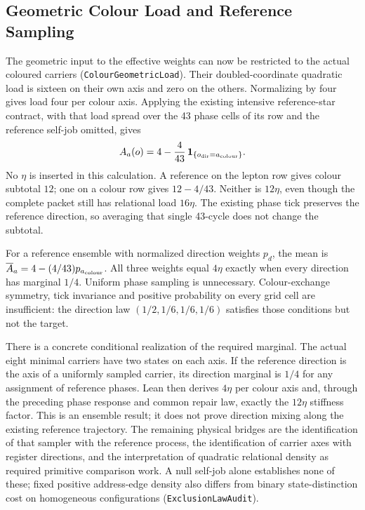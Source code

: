 \subsection{Geometric Colour Load and Reference Sampling}

The geometric input to the effective weights can now be restricted to the actual coloured carriers (\texttt{ColourGeometricLoad}). Their doubled-coordinate quadratic load is sixteen on their own axis and zero on the others. Normalizing by four gives load four per colour axis. Applying the existing intensive reference-star contract, with that load spread over the 43 phase cells of its row and the reference self-job omitted, gives
\begin{equation}
 A_a(o)=4-\frac{4}{43}\,\mathbf{1}_{\{o_{\rm dir}=a_{\rm colour}\}}.
\end{equation}
No $\eta$ is inserted in this calculation. A reference on the lepton row gives colour subtotal $12$; one on a colour row gives $12-4/43$. Neither is $12\eta$, even though the complete packet still has relational load $16\eta$. The existing phase tick preserves the reference direction, so averaging that single 43-cycle does not change the subtotal.

For a reference ensemble with normalized direction weights $p_d$, the mean is $\overline A_a=4-(4/43)p_{a_{\rm colour}}$. All three weights equal $4\eta$ exactly when every direction has marginal $1/4$. Uniform phase sampling is unnecessary. Colour-exchange symmetry, tick invariance and positive probability on every grid cell are insufficient: the direction law $(1/2,1/6,1/6,1/6)$ satisfies those conditions but not the target.

There is a concrete conditional realization of the required marginal. The actual eight minimal carriers have two states on each axis. If the reference direction is the axis of a uniformly sampled carrier, its direction marginal is $1/4$ for any assignment of reference phases. Lean then derives $4\eta$ per colour axis and, through the preceding phase response and common repair law, exactly the $12\eta$ stiffness factor. This is an ensemble result; it does not prove direction mixing along the existing reference trajectory. The remaining physical bridges are the identification of that sampler with the reference process, the identification of carrier axes with register directions, and the interpretation of quadratic relational density as required primitive comparison work. A null self-job alone establishes none of these; fixed positive address-edge density also differs from binary state-distinction cost on homogeneous configurations (\texttt{ExclusionLawAudit}).

